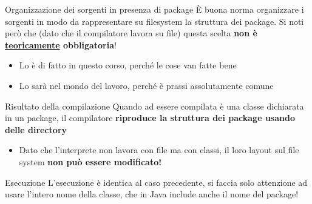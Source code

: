 \documentclass[xcolor=dvipsnames,presentation]{beamer}
\begin{document}
\begin{frame}{Organizzazione dei sorgenti in presenza di package}
        È buona norma organizzare i sorgenti in modo da rappresentare su filesystem la struttura
dei package. Si noti però che (dato che il compilatore lavora su \alert{file}) questa scelta
\textbf{non è \underline{teoricamente} obbligatoria}!
    \begin{itemize}
        \item Lo è di fatto in questo corso, perché le cose van fatte bene
        \item Lo sarà nel mondo del lavoro, perché è prassi assolutamente comune
    \end{itemize}
    \begin{block}{Risultato della compilazione}
        Quando ad essere compilata è una classe dichiarata in un package, il compilatore
\textbf{riproduce la struttura dei package usando delle directory}
        \begin{itemize}
            \item Dato che l'interprete non lavora con file ma con \alert{classi}, il loro layout
sul file system \textbf{non può essere modificato!}
        \end{itemize}
    \end{block}
    \begin{block}{Esecuzione}
        L'esecuzione è identica al caso precedente, si faccia solo attenzione ad
usare l'intero nome della classe, che in Java include anche il nome del package!
    \end{block}
\end{frame}
\end{document}
